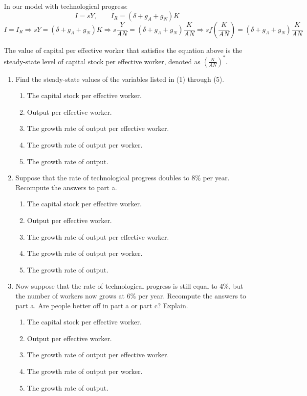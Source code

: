 \documentclass[12pt]{article}
\begin{document}
In our model with technological progress:
\[
I = sY,\qquad I_R = (\delta + g_A + g_N)K
\]
\[
I = I_R \Rightarrow sY = (\delta + g_A + g_N)K \Rightarrow s\frac{Y}{AN} = (\delta + g_A + g_N)\frac{K}{AN} \Rightarrow s f\!\left(\frac{K}{AN}\right) = (\delta + g_A + g_N)\frac{K}{AN}
\]

The value of capital per effective worker that satisfies the equation above is the steady-state level of capital stock per effective worker, denoted as \(\left(\frac{K}{AN}\right)^*\).

\begin{enumerate}[label=(\alph*)]
    \item Find the steady-state values of the variables listed in (1) through (5).
    \begin{enumerate}[label=\roman*.]
        \item The capital stock per effective worker.
        \item Output per effective worker.
        \item The growth rate of output per effective worker.
        \item The growth rate of output per worker.
        \item The growth rate of output.
    \end{enumerate}

    \item Suppose that the rate of technological progress doubles to 8\% per year. Recompute the answers to part a.
    \begin{enumerate}[label=\roman*.]
        \item The capital stock per effective worker.
        \item Output per effective worker.
        \item The growth rate of output per effective worker.
        \item The growth rate of output per worker.
        \item The growth rate of output.
    \end{enumerate}

    \item Now suppose that the rate of technological progress is still equal to 4\%, but the number of workers now grows at 6\% per year. Recompute the answers to part a. Are people better off in part a or part c? Explain.
    \begin{enumerate}[label=\roman*.]
        \item The capital stock per effective worker.
        \item Output per effective worker.
        \item The growth rate of output per effective worker.
        \item The growth rate of output per worker.
        \item The growth rate of output.
    \end{enumerate}
\end{enumerate}
\end{document}
